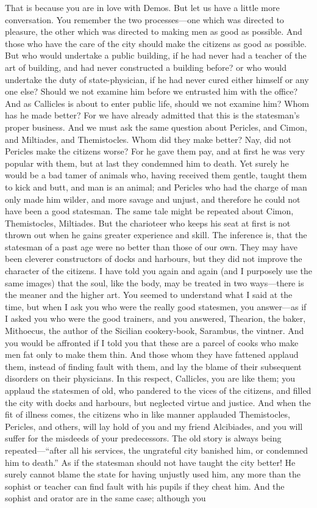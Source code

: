 \documentclass[11pt,letter]{article}
\begin{document}
\par  That is because you are in love with Demos. But let us have a little more conversation. You remember the two processes—one which was directed to pleasure, the other which was directed to making men as good as possible. And those who have the care of the city should make the citizens as good as possible. But who would undertake a public building, if he had never had a teacher of the art of building, and had never constructed a building before? or who would undertake the duty of state-physician, if he had never cured either himself or any one else? Should we not examine him before we entrusted him with the office? And as Callicles is about to enter public life, should we not examine him? Whom has he made better? For we have already admitted that this is the statesman’s proper business. And we must ask the same question about Pericles, and Cimon, and Miltiades, and Themistocles. Whom did they make better? Nay, did not Pericles make the citizens worse? For he gave them pay, and at first he was very popular with them, but at last they condemned him to death. Yet surely he would be a bad tamer of animals who, having received them gentle, taught them to kick and butt, and man is an animal; and Pericles who had the charge of man only made him wilder, and more savage and unjust, and therefore he could not have been a good statesman. The same tale might be repeated about Cimon, Themistocles, Miltiades. But the charioteer who keeps his seat at first is not thrown out when he gains greater experience and skill. The inference is, that the statesman of a past age were no better than those of our own. They may have been cleverer constructors of docks and harbours, but they did not improve the character of the citizens. I have told you again and again (and I purposely use the same images) that the soul, like the body, may be treated in two ways—there is the meaner and the higher art. You seemed to understand what I said at the time, but when I ask you who were the really good statesmen, you answer—as if I asked you who were the good trainers, and you answered, Thearion, the baker, Mithoecus, the author of the Sicilian cookery-book, Sarambus, the vintner. And you would be affronted if I told you that these are a parcel of cooks who make men fat only to make them thin. And those whom they have fattened applaud them, instead of finding fault with them, and lay the blame of their subsequent disorders on their physicians. In this respect, Callicles, you are like them; you applaud the statesmen of old, who pandered to the vices of the citizens, and filled the city with docks and harbours, but neglected virtue and justice. And when the fit of illness comes, the citizens who in like manner applauded Themistocles, Pericles, and others, will lay hold of you and my friend Alcibiades, and you will suffer for the misdeeds of your predecessors. The old story is always being repeated—“after all his services, the ungrateful city banished him, or condemned him to death.” As if the statesman should not have taught the city better! He surely cannot blame the state for having unjustly used him, any more than the sophist or teacher can find fault with his pupils if they cheat him. And the sophist and orator are in the same case; although you 
\end{document}
